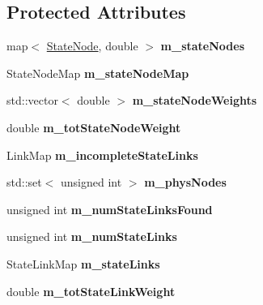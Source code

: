 \subsection*{Protected Attributes}
\begin{DoxyCompactItemize}
\item 
\mbox{\label{classMemNetwork_ac706a78a4f646f1c2b9828711298e0a6}} 
map$<$ \mbox{\hyperlink{structStateNode}{State\+Node}}, double $>$ {\bfseries m\+\_\+state\+Nodes}
\item 
\mbox{\label{classMemNetwork_a895ed9cdf6f0dee0deeaed21fdeafa85}} 
State\+Node\+Map {\bfseries m\+\_\+state\+Node\+Map}
\item 
\mbox{\label{classMemNetwork_a117526846877a6823dd8b5d8d6889b35}} 
std\+::vector$<$ double $>$ {\bfseries m\+\_\+state\+Node\+Weights}
\item 
\mbox{\label{classMemNetwork_ad5b3d6b5da22a29a409194041a28e2a3}} 
double {\bfseries m\+\_\+tot\+State\+Node\+Weight}
\item 
\mbox{\label{classMemNetwork_a7594289a82cf1824d7c7b929a3e86dc9}} 
Link\+Map {\bfseries m\+\_\+incomplete\+State\+Links}
\item 
\mbox{\label{classMemNetwork_af517f59c8a83be477b0ab1dc7aa2f4fb}} 
std\+::set$<$ unsigned int $>$ {\bfseries m\+\_\+phys\+Nodes}
\item 
\mbox{\label{classMemNetwork_a57085fec03a1541df84e4d6ee19e823a}} 
unsigned int {\bfseries m\+\_\+num\+State\+Links\+Found}
\item 
\mbox{\label{classMemNetwork_a713b9d3b7f9f9efebee37f02477e8ea2}} 
unsigned int {\bfseries m\+\_\+num\+State\+Links}
\item 
\mbox{\label{classMemNetwork_a5348b97b2d1af2815ae73619cdc5695c}} 
State\+Link\+Map {\bfseries m\+\_\+state\+Links}
\item 
\mbox{\label{classMemNetwork_a2ef328a3ab98dc5843809a1958fb7036}} 
double {\bfseries m\+\_\+tot\+State\+Link\+Weight}

\end{DoxyCompactItemize}
